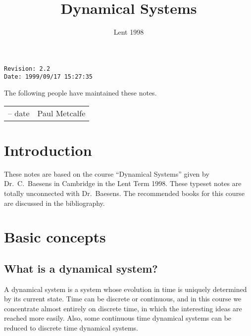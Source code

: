 \documentclass{notes}
\theoremstyle{plain}
\begin{document}
\frontmatter

\title{Dynamical Systems}

\date{Lent 1998}
\maketitle

\thispagestyle{empty}
\noindent\verb$Revision: 2.2 $\hfill\\
\noindent\verb$Date: 1999/09/17 15:27:35 $\hfill

\vspace{1.5in}

The following people have maintained these notes.

\begin{center}
\begin{tabular}{ r  l}
-- date & Paul Metcalfe
\end{tabular}
\end{center}

\tableofcontents

\chapter{Introduction}

These notes are based on the course ``Dynamical Systems'' given by
Dr.~C.~Baesens in Cambridge in the Lent Term 1998.  These typeset
notes are totally unconnected with Dr.~Baesens.  The recommended books
for this course are discussed in the bibliography.

\alsoavailable
\archimcopyright

\mainmatter

\chapter{Basic concepts}

\section{What is a dynamical system?}

A dynamical system is a system whose evolution in time is uniquely determined
by its current state.  Time can be discrete or continuous, and in this
course we concentrate almost entirely on discrete time, in which the
interesting ideas are reached more easily.  Also, some continuous time
dynamical systems can be reduced to discrete time dynamical systems.
\end{document}
